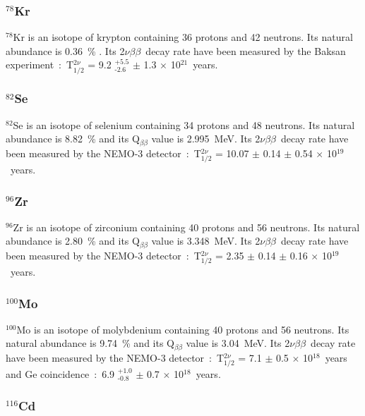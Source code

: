 \documentclass[main.tex]{subfiles}
\begin{document}
\subsubsection{$^{\text{78}}$Kr}


\NI $^\text{78}$Kr is an isotope of krypton containing 36 protons and 42 neutrons. Its natural abundance is 0.36~\% . Its 2$\nu\beta\beta$~decay rate have been measured by the Baksan experiment~:~T$_{\text{1/2}}^{\text{2}\nu}$ = 9.2 $^{\text{+5.5}}_{\text{-2.6}}$ $\pm$ 1.3 $\times$ 10$^{\text{21}}$~years.   


\subsubsection{$^{\text{82}}$Se}


\NI $^\text{82}$Se is an isotope of selenium containing 34 protons and 48 neutrons. Its natural abundance is 8.82~\% and its Q$_{\beta\beta}$ value is 2.995~MeV. Its 2$\nu\beta\beta$~decay rate have been measured by the NEMO-3 detector~:~T$_{\text{1/2}}^{\text{2}\nu}$ = 10.07 $\pm$ 0.14 $\pm$ 0.54 $\times$ 10$^{\text{19}}$~years. 


\subsubsection{$^{\text{96}}$Zr}


\NI $^\text{96}$Zr is an isotope of zirconium containing 40 protons and 56 neutrons. Its natural abundance is 2.80~\% and its Q$_{\beta\beta}$ value is 3.348~MeV. Its 2$\nu\beta\beta$~decay rate have been measured by the NEMO-3 detector~:~T$_{\text{1/2}}^{\text{2}\nu}$ = 2.35 $\pm$ 0.14 $\pm$ 0.16 $\times$ 10$^{\text{19}}$~years.


\subsubsection{$^{\text{100}}$Mo}


\NI $^\text{100}$Mo is an isotope of molybdenium containing 40 protons and 56 neutrons. Its natural abundance is 9.74~\% and its Q$_{\beta\beta}$ value is 3.04~MeV. Its 2$\nu\beta\beta$~decay rate have been measured by the NEMO-3 detector~:~T$_{\text{1/2}}^{\text{2}\nu}$ = 7.1 $\pm$ 0.5 $\times$ 10$^{\text{18}}$~years and Ge coincidence~:~6.9 $^{\text{+1.0}}_{\text{-0.8}}$ $\pm$ 0.7 $\times$ 10$^{\text{18}}$~years.


\subsubsection{$^{\text{116}}$Cd}
\end{document}
